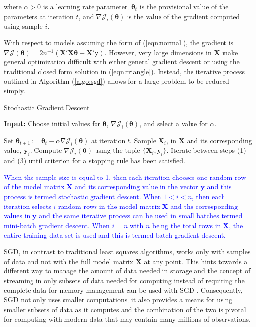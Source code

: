 \documentclass[12pt]{article}
\begin{document}
\noindent where $\alpha > 0$ is a learning rate parameter, $\bm{\theta}_t$ is the provisional value of the parameters at iteration $t$, and $\nabla\mathcal{J}_i(\bm{\theta})$ is the value of the gradient computed using sample $i$. 

With respect to models assuming the form of (\ref{eqn:normal}), the gradient is $\nabla\mathcal{J}(\bm{\theta}) = 2n^{-1}(\bm{X}'\bm{X}\bm{\theta}-\bm{X}'\bm{y})$. However, very large dimensions in $\bm{X}$ make general optimization difficult with either general gradient descent or using the traditional closed form solution in (\ref{eqn:triangle}). Instead, the iterative process outlined in Algorithm (\ref{algo:sgd}) allows for a large problem to be reduced simply. 

\begin{algorithm}
\caption{Stochastic Gradient Descent}
\label{algo:sgd}
	\hspace*{\algorithmicindent} \textbf{Input:} Choose initial values for $\bm{\theta}$, $\nabla\mathcal{J}_i(\bm{\theta})$, and select a value for $\alpha$.
\begin{algorithmic}[1]
	\State Set $\bm{\theta}_{t+1}:= \bm{\theta}_t - \alpha\nabla\mathcal{J}_i(\bm{\theta})$ at iteration $t$.
	\State Sample $\bm{X}_i$, in $\bm{X}$ and its corresponding value, $\bm{y}_i$.
	\State Compute $\nabla\mathcal{J}_i(\bm{\theta})$ using the tuple $\{\bm{X}_i, \bm{y}_i\}$.
	\State Iterate between steps (1) and (3) until criterion for a stopping rule has been satisfied. 
\end{algorithmic}
\end{algorithm}

\textcolor{blue}{When the sample size is equal to 1, then each iteration chooses one random row of the model matrix $\bm{X}$ and its corresponding value in the vector $\bm{y}$ and this process is termed stochastic gradient descent. When $1 < i < n$, then each iteration selects $i$ random rows in the model matrix $\bm{X}$ and the corresponding values in $\bm{y}$ and the same iterative process can be used in small batches termed mini-batch gradient descent. When $i=n$ with $n$ being the total rows in $\bm{X}$, the entire training data set is used and this is termed batch gradient descent.}

SGD, in contrast to traditional least squares algorithms, works only with samples of data and not with the full model matrix $\bm{X}$ at any point. This hints towards a different way to manage the amount of data needed in storage and the concept of streaming in only subsets of data needed for computing instead of requiring the complete data for memory management can be used with SGD \cite{tran}. Consequently, SGD not only uses smaller computations, it also provides a means for using smaller subsets of data as it computes and the combination of the two is pivotal for computing with modern data that may contain many millions of observations. 
\end{document}
